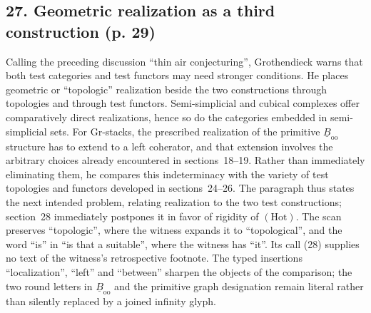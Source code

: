\documentclass[10pt,oneside]{book}
\begin{document}
\subsection*{27. Geometric realization as a third construction (p. 29)}
Calling the preceding discussion ``thin air conjecturing'', Grothendieck warns that both test categories and test functors may need stronger conditions. He places geometric or ``topologic'' realization beside the two constructions through topologies and through test functors. Semi-simplicial and cubical complexes offer comparatively direct realizations, hence so do the categories embedded in semi-simplicial sets. For Gr-stacks, the prescribed realization of the primitive $\underline B_{\mathrm{oo}}$ structure has to extend to a left coherator, and that extension involves the arbitrary choices already encountered in sections~18--19. Rather than immediately eliminating them, he compares this indeterminacy with the variety of test topologies and functors developed in sections~24--26. The paragraph thus states the next intended problem, relating realization to the two test constructions; section~28 immediately postpones it in favor of rigidity of $(\mathrm{Hot})$. The scan preserves ``topologic'', where the witness expands it to ``topological'', and the word ``is'' in ``is that a suitable'', where the witness has ``it''. Its call (28) supplies no text of the witness's retrospective footnote. The typed insertions ``localization'', ``left'' and ``between'' sharpen the objects of the comparison; the two round letters in $\underline B_{\mathrm{oo}}$ and the primitive graph designation remain literal rather than silently replaced by a joined infinity glyph.
\end{document}
